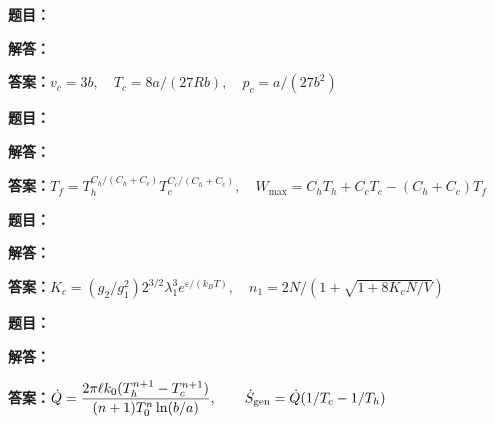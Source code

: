 \documentclass[lang=cn,color=blue,11pt]{elegantbook}
\begin{document}
\noindent\textbf{题目：}
\par\noindent\textbf{解答：}
\par\noindent\textbf{答案：}\(\displaystyle v_c=3b,\quad T_c=8a/(27Rb),\quad p_c=a/(27b^2)\)\par
\par\smallskip\noindent\hrulefill\par\medskip
{}\par
\noindent\textbf{题目：}
\par\noindent\textbf{解答：}
\par\noindent\textbf{答案：}\(\displaystyle T_f=T_h^{C_h/(C_h+C_c)}T_c^{C_c/(C_h+C_c)},\quad W_{\max}=C_hT_h+C_cT_c-(C_h+C_c)T_f\)\par
\par\smallskip\noindent\hrulefill\par\medskip
{}\par
\noindent\textbf{题目：}
\par\noindent\textbf{解答：}
\par\noindent\textbf{答案：}\(\displaystyle K_c=(g_2/g_1^2)2^{3/2}\lambda_1^3 e^{\varepsilon/(k_BT)},\quad n_1=2N/(1+\sqrt{1+8K_cN/V})\)\par
\par\smallskip\noindent\hrulefill\par\medskip
{}\par
\noindent\textbf{题目：}
\par\noindent\textbf{解答：}
\par\noindent\textbf{答案：}\(\displaystyle \dot Q=\frac{2\pi\ell k_0(T_h^{n+1}-T_c^{n+1})}{(n+1)T_0^n\ln(b/a)},\qquad\dot S_{\rm gen}=\dot Q(1/T_c-1/T_h)\)\par
\par\smallskip\noindent\hrulefill\par\medskip
{}\par
\end{document}
